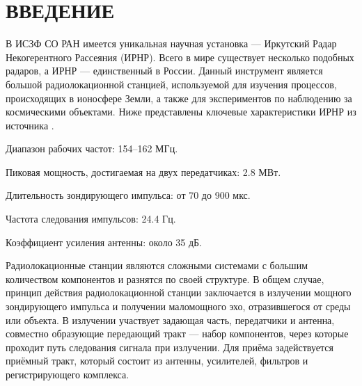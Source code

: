 \documentclass{report}
\begin{document}



\setcounter{page}{2} %
\tableofcontents  %

\setcounter{chapter}{0} %
\setcounter{section}{0} %
\setcounter{subsection}{0} %
\setcounter{equation}{0} %


\chapter*{ВВЕДЕНИЕ} %

В ИСЗФ СО РАН имеется уникальная научная установка --- Иркутский Радар Некогерентного Рассеяния (ИРНР). Всего в мире существует несколько подобных радаров, а ИРНР --- единственный в России. Данный инструмент является большой радиолокационной станцией, используемой для изучения процессов, происходящих в ионосфере Земли, а также для экспериментов по наблюдению за космическими объектами. Ниже представлены ключевые характеристики ИРНР из источника \cite{irnr1}.

\begin{enummarker}
    \item Диапазон рабочих частот: 154--162 МГц.
    \item Пиковая мощность, достигаемая на двух передатчиках: 2.8 МВт.
    \item Длительность зондирующего импульса: от 70 до 900 мкс.
    \item Частота следования импульсов: 24.4 Гц.
    \item Коэффициент усиления антенны: около 35 дБ.
\end{enummarker}

Радиолокационные станции являются сложными системами с большим количеством компонентов и разнятся по своей структуре. В общем случае, принцип действия радиолокационной станции заключается в излучении мощного зондирующего импульса и получении маломощного эхо, отразившегося от среды или объекта. В излучении участвует задающая часть, передатчики и антенна, совместно образующие передающий тракт --- набор компонентов, через которые проходит путь следования сигнала при излучении. Для приёма задействуется приёмный тракт, который состоит из антенны, усилителей, фильтров и регистрирующего комплекса.
\end{document}
